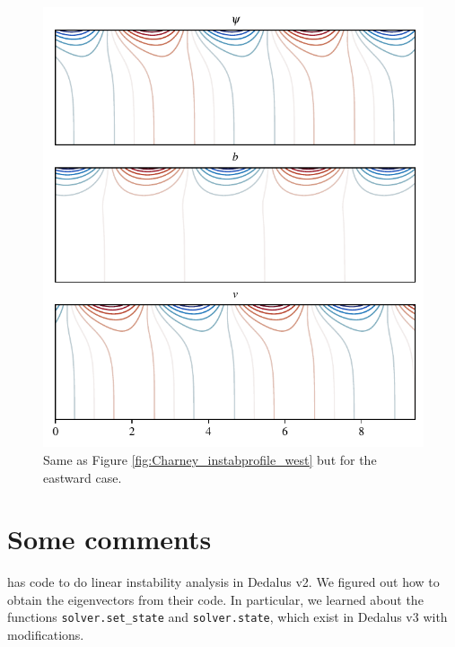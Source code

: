 \begin{figure}
    \centering
    \includegraphics{Charney_instabprofile_east}
    \caption{Same as Figure \ref{fig:Charney_instabprofile_west} but for the eastward case.}
    \label{fig:Charney_instabprofile_east}
\end{figure}

\section{Some comments}
\cite{LuoCallies_23} has code to do linear instability analysis in Dedalus v2. We figured out how to obtain the eigenvectors from their code. In particular, we learned about the functions \verb|solver.set_state| and \verb|solver.state|, which exist in Dedalus v3 with modifications.